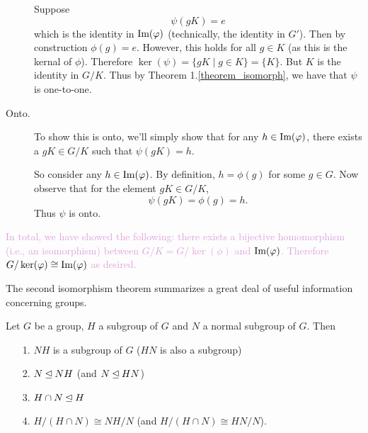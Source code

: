 \begin{prf}
\begin{description}
            Suppose 
            \[
                \psi(gK) = e
            \] which is the identity in $\mbox{Im}(\varphi)$ (technically, the identity in $G'$). Then by construction $\phi(g) = e.$ 
            However, this holds for all $g \in K$ (as this is the
            kernal of $\phi$). Therefore
            $\ker(\psi) = \{gK \mid g \in K\} = \{K\}$. But $K$ is the
            identity in $G/K$. Thus by Theorem
            1.\ref{theorem_isomorph}, we have that $\psi$ is
            one-to-one.
            
            \item[Onto.] To show this is onto, we'll simply show that
            for any $h \in \mbox{Im}(\varphi)$, there exists a $gK \in G/K$
            such that $\psi(gK) = h$. 

            So consider any $h \in \mbox{Im}(\varphi)$. By definition, $h = \phi(g)$ for
            some $g \in G$. Now observe that for the element $gK \in
            G/K$, 
            \[
                \psi(gK) = \phi(g) = h.
            \]
            Thus $\psi$ is onto.
        \end{description}
        \textcolor{Plum}{In total, we have showed the following: there exists a
        bijective homomorphism (i.e., an isomorphism) between $G/K = G/\ker(\phi)$ and
        $\mbox{Im}(\varphi)$. Therefore $G/\ker(\varphi) \cong \mbox{Im}(\varphi)$ as desired.}
    \end{prf}
    The second isomorphism theorem summarizes a great deal of useful
    information concerning groups. 

    \begin{thm}
        Let $G$ be a group, $H$ a subgroup of $G$ and $N$ a normal
        subgroup of $G$. Then 
        \begin{itemize}
            \item[1.] $NH$ is a subgroup of $G$ ($HN$ is also a subgroup)
            \item[2.] $N \unlhd NH$ (and $N \unlhd HN$)
            \item[3.] $H \cap N \unlhd H$ 
            \item[4.] $H/(H \cap N) \cong NH/N$ (and $H/(H \cap N) \cong HN/N$).
        \end{itemize}
    \end{thm}

